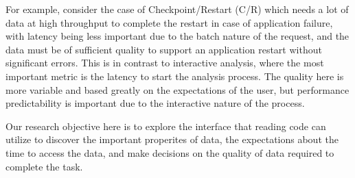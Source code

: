 For example, consider the case of Checkpoint/Restart (C/R) which needs a lot
of data at high throughput to complete the restart in case of application
failure, with latency being less important due to the batch nature of the
request, and the data must be of sufficient quality to support an
application restart without significant errors. 
This is in contrast to interactive analysis, where the most important metric
is the latency to start the analysis process. The quality here is more
variable and based greatly on the expectations of the user, but performance
predictability is important due to the interactive nature of the process. 

Our research objective here is to explore the interface that reading code
can utilize to discover the important properites of data, the expectations
about the time to access the data, and make decisions on the quality of data
required to complete the task. 

